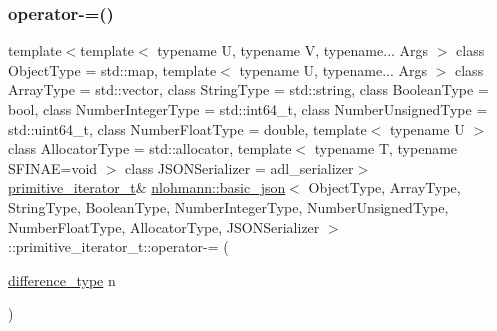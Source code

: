 \subsubsection{\texorpdfstring{operator-\/=()}{operator-=()}}
{\footnotesize\ttfamily template$<$template$<$ typename U, typename V, typename... Args $>$ class Object\+Type = std\+::map, template$<$ typename U, typename... Args $>$ class Array\+Type = std\+::vector, class String\+Type  = std\+::string, class Boolean\+Type  = bool, class Number\+Integer\+Type  = std\+::int64\+\_\+t, class Number\+Unsigned\+Type  = std\+::uint64\+\_\+t, class Number\+Float\+Type  = double, template$<$ typename U $>$ class Allocator\+Type = std\+::allocator, template$<$ typename T, typename S\+F\+I\+N\+A\+E=void $>$ class J\+S\+O\+N\+Serializer = adl\+\_\+serializer$>$ \\
\hyperlink{classnlohmann_1_1basic__json_1_1primitive__iterator__t}{primitive\+\_\+iterator\+\_\+t}\& \hyperlink{classnlohmann_1_1basic__json}{nlohmann\+::basic\+\_\+json}$<$ Object\+Type, Array\+Type, String\+Type, Boolean\+Type, Number\+Integer\+Type, Number\+Unsigned\+Type, Number\+Float\+Type, Allocator\+Type, J\+S\+O\+N\+Serializer $>$\+::primitive\+\_\+iterator\+\_\+t\+::operator-\/= (\begin{DoxyParamCaption}\item[{\hyperlink{classnlohmann_1_1basic__json_afe7c1303357e19cea9527af4e9a31d8f}{difference\+\_\+type}}]{n }\end{DoxyParamCaption})\hspace{0.3cm}{\ttfamily [inline]}}

\mbox{\label{classnlohmann_1_1basic__json_1_1primitive__iterator__t_ad1022740034c5cce15436ecb4620259d}} 
